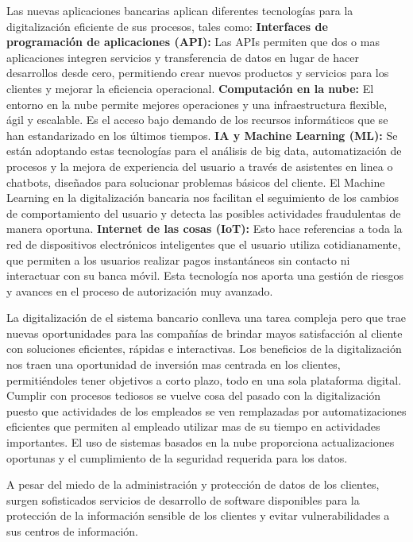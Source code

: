 Las nuevas aplicaciones bancarias aplican diferentes tecnologías para la digitalización eficiente de sus procesos, tales como: 
\textbf{Interfaces de programación de aplicaciones (API):} Las APIs permiten que dos o mas aplicaciones integren servicios y transferencia de datos en lugar de hacer desarrollos desde cero, permitiendo crear nuevos productos y servicios para los clientes y mejorar la eficiencia operacional.
\textbf{Computación en la nube:} El entorno en la nube permite mejores operaciones y una infraestructura flexible, ágil y escalable. Es el acceso bajo demando de los recursos informáticos que se han estandarizado en los últimos tiempos.
\textbf{IA y Machine Learning (ML):} Se están adoptando estas tecnologías para el análisis de big data, automatización de procesos y la mejora de experiencia del usuario a través de asistentes en linea o chatbots, diseñados para solucionar problemas básicos del cliente. El Machine Learning en la digitalización bancaria nos facilitan el seguimiento de los cambios de comportamiento del usuario y detecta las posibles actividades fraudulentas de manera oportuna. 
\textbf{Internet de las cosas (IoT):} Esto hace referencias a toda la red de dispositivos electrónicos inteligentes que el usuario utiliza cotidianamente, que permiten a los usuarios realizar pagos instantáneos sin contacto ni interactuar con su banca móvil. Esta tecnología nos aporta una gestión de riesgos y avances en el proceso de autorización muy avanzado.

La digitalización de el sistema bancario conlleva una tarea compleja pero que trae nuevas oportunidades para las compañías de brindar mayos satisfacción al cliente con soluciones eficientes, rápidas e interactivas. Los beneficios de la digitalización nos traen una oportunidad de inversión mas centrada en los clientes, permitiéndoles tener objetivos a corto plazo, todo en una sola plataforma digital.\\
Cumplir con procesos tediosos se vuelve cosa del pasado con la digitalización puesto que actividades de los empleados se ven remplazadas por automatizaciones eficientes que permiten al empleado utilizar mas de su tiempo en actividades importantes. El uso de sistemas basados en la nube proporciona actualizaciones oportunas y el cumplimiento de la seguridad requerida para los datos.

A pesar del miedo de la administración y protección de datos de los clientes, surgen sofisticados servicios de desarrollo de software disponibles para la protección de la información sensible de los clientes y evitar vulnerabilidades a sus centros de información.


